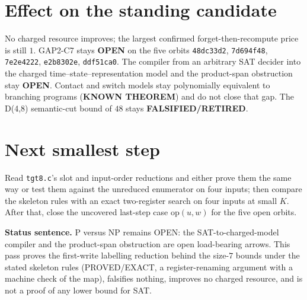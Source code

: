 \documentclass[11pt]{article}
\begin{document}
\section*{Effect on the standing candidate}
No charged resource improves; the largest confirmed forget-then-recompute price is still $1$. GAP2-C7 stays \textbf{OPEN} on the five orbits \texttt{48dc33d2}, \texttt{7d694f48}, \texttt{7e2e4222}, \texttt{e2b8302e}, \texttt{ddf51ca0}. The compiler from an arbitrary SAT decider into the charged time--state--representation model and the product-span obstruction stay \textbf{OPEN}. Contact and switch models stay polynomially equivalent to branching programs (\textbf{KNOWN THEOREM}) and do not close that gap. The D(4,8) semantic-cut bound of $48$ stays \textbf{FALSIFIED/RETIRED}.

\section*{Next smallest step}
Read \texttt{tgt8.c}'s slot and input-order reductions and either prove them the same way or test them against the unreduced enumerator on four inputs; then compare the skeleton rules with an exact two-register search on four inputs at small $K$. After that, close the uncovered last-step case $\mathrm{op}(u,w)$ for the five open orbits.

\bigskip
\noindent\textbf{Status sentence.} P versus NP remains OPEN: the SAT-to-charged-model compiler and the product-span obstruction are open load-bearing arrows. This pass proves the first-write labelling reduction behind the size-$7$ bounds under the stated skeleton rules (PROVED/EXACT, a register-renaming argument with a machine check of the map), falsifies nothing, improves no charged resource, and is not a proof of any lower bound for SAT.
\end{document}
